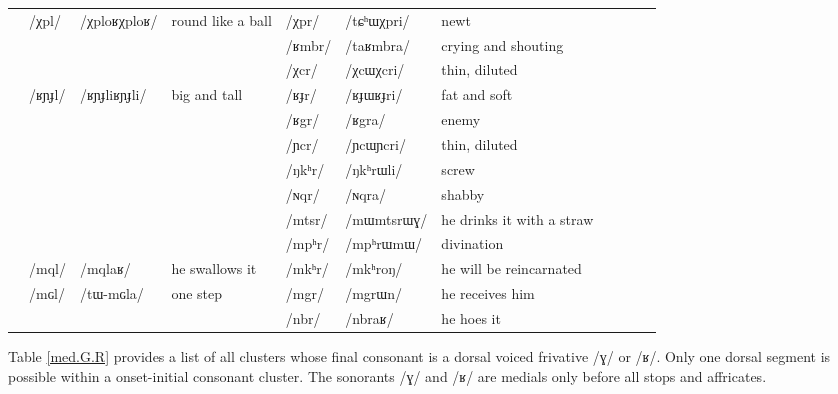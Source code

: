 \documentclass[oldfontcommands,oneside,a4paper,11pt]{article}
\newcommand{\ipa}[1]{/#1/} %
\newcommand{\tib}[1]{\cellcolor{lightgray}\textbf{#1}}
\newcommand{\idph}[1]{\cellcolor{gray}\textbf{#1}}
\begin{document}
\begin{table}
{\begin{tabular}{l|lll|lll|lll|l}
	\midrule	
&		\ipa{χpl} \idph{}&	\ipa{χploʁχploʁ}  &	round like a ball&	\ipa{χpr}  & 	\ipa{tɕʰɯχpri}  & 	newt	\\
&	&	&	&	\ipa{ʁmbr}  & 	\ipa{taʁmbra}  & 	crying and shouting	\\
&	&	&	&	\ipa{χcr} \idph{} & 	\ipa{χcɯχcri}  & 	thin, diluted 	\\
&	\ipa{ʁɲɟl}  \idph{}& 	\ipa{ʁɲɟliʁɲɟli}  & big and tall	&	\ipa{ʁɟr}  \idph{}& 	\ipa{ʁɟɯʁɟri}  & 	fat and soft	\\
&	&	&	&	\ipa{ʁgr} \tib{}  & 	\ipa{ʁgra}  & 	enemy	\\
\midrule
&	&	&	&	\ipa{ɲcr} \idph{} & 	\ipa{ɲcɯɲcri}  &thin, diluted 	\\	
&	&	&	&	\ipa{ŋkʰr}  & 	\ipa{ŋkʰrɯli}  &screw 	\\	
&	&	&	&	\ipa{ɴqr}  & 	\ipa{ɴqra}  & shabby	\\	
\midrule
&	&	&	&	\ipa{mtsr}  & 	\ipa{mɯmtsrɯɣ}  &he drinks it with a straw 	\\	
&	&	&	&	\ipa{mpʰr}  & 	\ipa{mpʰrɯmɯ}  & divination	\\	
&	\ipa{mql}  & 	\ipa{mqlaʁ}  & he swallows it	&	\ipa{mkʰr}  & 	\ipa{mkʰroŋ}  &he will be reincarnated 	\\	
&	\ipa{mɢl}  & 	\ipa{tɯ-mɢla}  & one step	&	\ipa{mgr}  & 	\ipa{mgrɯn}  & he receives him	\\	
\midrule
&	&	&	&	\ipa{nbr}  & 	\ipa{nbraʁ}  &he hoes it 	\\	
\end{tabular}}
\end{table}	
						
		Table  \ref{med.G.R} provides a  list of all clusters whose final consonant is a dorsal voiced frivative  \ipa{ɣ} or \ipa{ʁ}.  Only one dorsal segment is possible within a onset-initial consonant cluster. The sonorants \ipa{ɣ} and \ipa{ʁ} are medials only before all stops and affricates.
						
\end{document}
